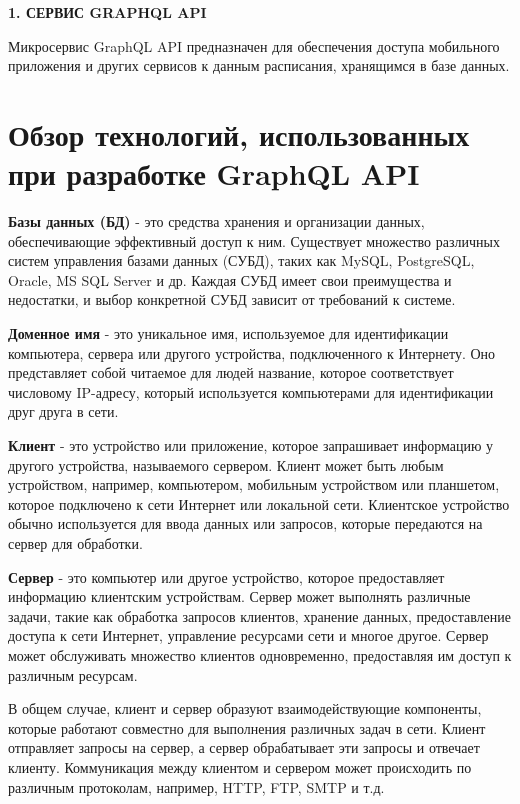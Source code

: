 \newpage
\begin{center}
    \textbf{\large 1. СЕРВИС GRAPHQL API}
\end{center}

Микросервис GraphQL API предназначен для обеспечения доступа мобильного приложения и других сервисов
к данным расписания, хранящимся в базе данных.

\section{Обзор технологий, использованных при разработке GraphQL API}

\textbf{Базы данных (БД)} - это средства хранения и организации данных,
обеспечивающие эффективный доступ к ним. Существует множество различных систем управления базами данных (СУБД),
таких как MySQL, PostgreSQL, Oracle, MS SQL Server и др.
Каждая СУБД имеет свои преимущества и недостатки, и выбор конкретной СУБД зависит от требований к системе.

\textbf{Доменное имя} - это уникальное имя, используемое для идентификации компьютера, сервера или другого устройства, подключенного к Интернету.
Оно представляет собой читаемое для людей название, которое соответствует числовому IP-адресу,
который используется компьютерами для идентификации друг друга в сети.

\textbf{Клиент} - это устройство или приложение, которое запрашивает информацию у другого устройства, называемого сервером. 
Клиент может быть любым устройством, например, компьютером, мобильным устройством или планшетом, 
которое подключено к сети Интернет или локальной сети. 
Клиентское устройство обычно используется для ввода данных или запросов, 
которые передаются на сервер для обработки.

\textbf{Сервер} - это компьютер или другое устройство, которое предоставляет информацию клиентским устройствам. 
Сервер может выполнять различные задачи, такие как обработка запросов клиентов, 
хранение данных, предоставление доступа к сети Интернет, управление ресурсами сети и многое другое.
Сервер может обслуживать множество клиентов одновременно, предоставляя им доступ к различным ресурсам.

В общем случае, клиент и сервер образуют взаимодействующие компоненты,
которые работают совместно для выполнения различных задач в сети.
Клиент отправляет запросы на сервер, а сервер обрабатывает эти запросы и отвечает клиенту.
Коммуникация между клиентом и сервером может происходить по различным протоколам, например, HTTP, FTP, SMTP и т.д.

